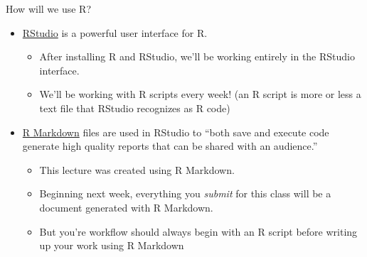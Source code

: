 \documentclass[
  8pt,
  ignorenonframetext,
  dvipsnames]{beamer}
\providecommand{\tightlist}{%
  \setlength{\itemsep}{0pt}\setlength{\parskip}{0pt}}
\let\olditem\item
\renewcommand{\item}{%
  \olditem\vspace{4pt}
}
\begin{document}
\begin{frame}{How will we use R?}
\protect\hypertarget{how-will-we-use-r}{}
\begin{itemize}
\tightlist
\item
  \href{https://www.rstudio.com/products/rstudio/download/preview}{RStudio}
  is a powerful user interface for R.

  \begin{itemize}
  \tightlist
  \item
    After installing R and RStudio, we'll be working entirely in the
    RStudio interface.
  \item
    We'll be working with R scripts every week! (an R script is more or
    less a text file that RStudio recognizes as R code)
  \end{itemize}
\end{itemize}

\medskip

\begin{itemize}
\tightlist
\item
  \href{https://rmarkdown.rstudio.com/lesson-1.html}{R Markdown} files
  are used in RStudio to ``both save and execute code generate high
  quality reports that can be shared with an audience.''

  \begin{itemize}
  \tightlist
  \item
    This lecture was created using R Markdown.
  \item
    Beginning next week, everything you \emph{submit} for this class
    will be a document generated with R Markdown.
  \item
    But you're workflow should always begin with an R script before
    writing up your work using R Markdown
  \end{itemize}
\end{itemize}
\end{frame}
\end{document}
